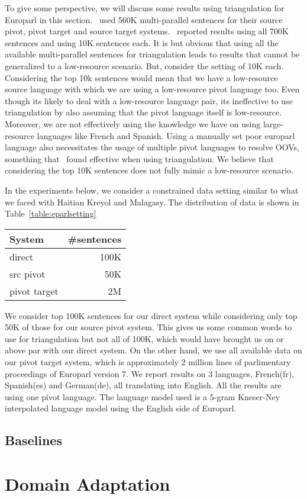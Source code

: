 To give some perspective, we will discuss some results using triangulation for Europarl in this section.~\cite{Utiyama:07} used 560K multi-parallel sentences for their source pivot, pivot target and source target systems.~\cite{Cohn:07} reported results using all 700K sentences and using 10K sentences each. It is but obvious that using all the available multi-parallel sentences for triangulation leads to results that cannot be generalized to a low-resource scenario. But, consider the setting of 10K each. Considering the top 10k sentences would mean that we have a low-resource source language with which we are using a low-resource pivot language too. Even though its likely to deal with a low-resource language pair, its ineffective to use triangulation by also assuming that the pivot language itself is low-resource. Moreover, we are not effectively using the knowledge we have on using large-resource languages like French and Spanish. Using a manually set poor europarl language also necessitates the usage of multiple pivot languages to resolve OOVs, something that~\cite{Cohn:07} found effective when using triangulation. We believe that considering the top 10K sentences does not fully mimic a low-resource scenario. 

In the experiments below, we consider a constrained data setting similar to what we faced with Haitian Kreyol and Malagasy. The distribution of data is shown in Table~\ref{table:eparlsetting}

\begin{table*}
	\small
	\centering
	\begin{tabular}{lr}
		\toprule
		System & \#sentences \\
		\toprule
		direct & 100K \\
		src pivot & 50K \\
		pivot target & 2M \\
		\bottomrule
	\end{tabular}
	\caption{Our own data setting for Europarl triangulation}
	\label{table:eparlsetting}
\end{table*}

We consider top 100K sentences for our direct system while considering only top 50K of those for our source pivot system. This gives us some common words to use for triangulation but not all of 100K, which would have brought us on or above par with our direct system. On the other hand, we use all available data on our pivot target system, which is approximately 2 million lines of parlimentary proceedings of Europarl version 7. We report results on 3 languages, French(fr), Spanish(es) and German(de), all translating into English. All the results are using one pivot language. The language model used is a 5-gram Kneser-Ney interpolated language model using the English side of Europarl. 


\subsection{Baselines}
	




\section{Domain Adaptation}


